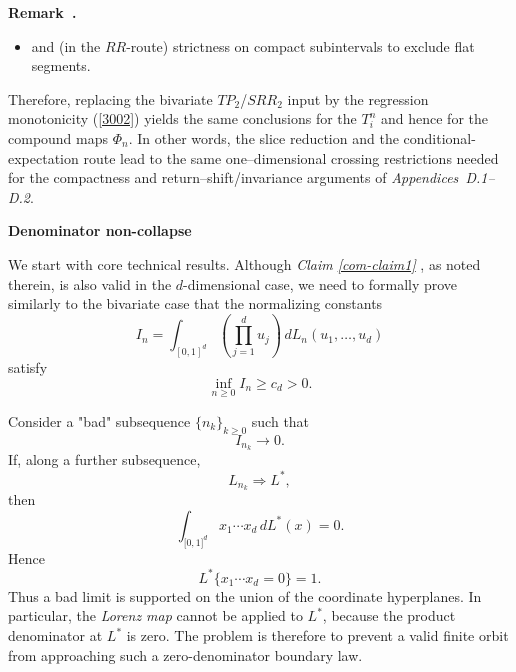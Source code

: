 \documentclass[onecolumn]{article}
\newenvironment{remark}{  \refstepcounter{theorem}  \par\medskip\noindent\textbf{Remark~\thetheorem.}\rmfamily\ }{\par\medskip}
\begin{document}
\begin{remark}
\begin{itemize}
\item and (in the $RR$-route) strictness on compact subintervals to exclude
flat segments.
\end{itemize}

Therefore, replacing the bivariate $TP_{2}$/$SRR_{2}$ input by the
regression monotonicity (\ref{3002}) yields the same conclusions for the $%
T_{i}^{n}$ and hence for the compound maps $\Phi _{n}$. In other words, the
slice reduction and the conditional-expectation route lead to the same
one--dimensional crossing restrictions needed for the compactness and
return--shift/invariance arguments of \textit{Appendices~D.1--D.2}.
\end{remark}

\begin{flushleft}
\textbf{Denominator non-collapse}
\end{flushleft}

We start with core technical results. Although \textit{Claim \ref{com-claim1}%
}, as noted therein, is also valid in the $d$-dimensional case, we need to
formally prove similarly to the bivariate case that the normalizing
constants 
\begin{equation}
I_{n}=\int_{[0,1]^{d}}\left( \prod_{j=1}^{d}u_{j}\right)
\,dL_{n}(u_{1},\ldots ,u_{d})  \label{4000}
\end{equation}%
satisfy 
\begin{equation}
\inf_{n\geq 0}I_{n}\geq c_{d}>0.  \label{4001}
\end{equation}

Consider a "bad" subsequence $\{n_{k}\}_{k\geq 0}$ such that 
\begin{equation}
I_{n_{k}}\longrightarrow 0.  \label{4001a}
\end{equation}%
If, along a further subsequence, 
\begin{equation}
L_{n_{k}}\Rightarrow L^{\ast },  \label{4001b}
\end{equation}%
then 
\begin{equation}
\int_{\lbrack 0,1]^{d}}x_{1}\cdots x_{d}\,dL^{\ast }(x)=0.  \label{4001c}
\end{equation}%
Hence 
\begin{equation}
L^{\ast }\{x_{1}\cdots x_{d}=0\}=1.  \label{4001d}
\end{equation}%
Thus a bad limit is supported on the union of the coordinate hyperplanes. In
particular, the \textit{Lorenz map} cannot be applied to $L^{\ast }$,
because the product denominator at $L^{\ast }$ is zero. The problem is
therefore to prevent a valid finite orbit from approaching such a
zero-denominator boundary law.
\end{document}
